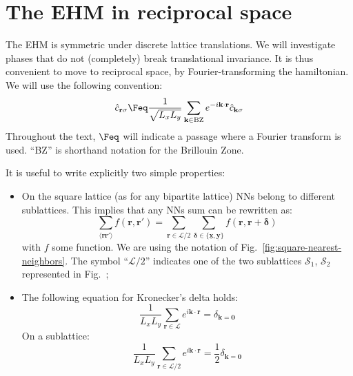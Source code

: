 \section{The EHM in reciprocal space}

The EHM is symmetric under discrete lattice translations. We will investigate phases that do not (completely) break translational invariance. It is thus convenient to move to reciprocal space, by Fourier-transforming the hamiltonian. We will use the following convention:
\begin{equation}\label{eq:fourier-convention}
	\hat c_{\mathbf{r}\sigma} \Feq \frac{1}{\sqrt{L_xL_y}} \sum_{\mathbf{k} \in \mathrm{BZ}} e^{-i \mathbf{k} \cdot \mathbf{r}} \hat c_{\mathbf{k}\sigma}
\end{equation}
Throughout the text, $\Feq$ will indicate a passage where a Fourier transform is used. ``BZ'' is shorthand notation for the Brillouin Zone.

It is useful to write explicitly two simple properties:
\begin{itemize}
	\item On the square lattice (as for any bipartite lattice) NNs belong to different sublattices. This implies that any NNs sum can be rewritten as:
	\begin{equation}\label{eq:ehm-NNs-sum(f)}
		\sum_{\langle \mathbf{r}\mathbf{r}' \rangle} f(\mathbf{r},\mathbf{r}') = \sum_{\mathbf{r}\in\mathcal{L}/2} \sum_{\bm{\delta}\in \lbrace \underline{\mathbf{x}}, \underline{\mathbf{y}} \rbrace} f(\mathbf{r},\mathbf{r}+\bm{\delta})
	\end{equation}
	with $f$ some function. We are using the notation of Fig.~\ref{fig:square-nearest-neighbors}. The symbol ``$\mathcal{L}/2$'' indicates one of the two sublattices $\mathcal{S}_1$, $\mathcal{S}_2$ represented in Fig.~\mref;
	\item The following equation for Kronecker's delta holds:
	\begin{equation}\label{eq:ehm-delta}
		\frac{1}{L_x L_y} \sum_{\mathbf{r} \in \mathcal{L}} e^{i \mathbf{k} \cdot \mathbf{r}} = \delta_{\mathbf{k}=\mathbf{0}}
	\end{equation}
	On a sublattice:
	\begin{equation}\label{eq:ehm-delta/2}
		\frac{1}{L_x L_y} \sum_{\mathbf{r} \in \mathcal{L}/2} e^{i \mathbf{k} \cdot \mathbf{r}} = \frac{1}{2} \delta_{\mathbf{k}=\mathbf{0}}
	\end{equation}
\end{itemize}

